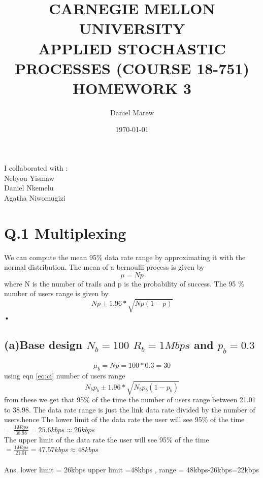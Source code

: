 \documentclass[a4paper,11pt]{article}
\begin{document}
\title{\color{red}CARNEGIE MELLON UNIVERSITY\\
APPLIED STOCHASTIC PROCESSES  (COURSE 18-751)\\
HOMEWORK 3}
\author{Daniel Marew}
\date{\today}
\clearpage\maketitle

\thispagestyle{empty}
\newpage
I collaborated with :\\
\hspace*{6cm}
Nebyou Yismaw\\
\hspace*{6cm}
Daniel    Nkemelu\\
\hspace*{6cm}
Agatha Niwomugizi
\thispagestyle{empty}
\newpage
\clearpage
\setcounter{page}{1}

\section*{Q.1 \quad Multiplexing}
We can compute the mean 95\% data rate range by approximating it with the normal distribution.
The mean of a bernoulli process   is given by $$\mu=Np$$
where N is the number of trails and p is the probability of success. 
The 95 \% number of users range is given by
\begin{equation}\label{eq:ci}
Np\pm1.96*\sqrt{Np(1-p)}
\end{equation}• 
\subsection*{(a)\quad Base design $N_b = 100$ $R_b = 1Mbps$ and $p_b=0.3$}
$$\mu_b = Np = 100*0.3=30$$
using eqn \ref{eq:ci} number of users range  $$N_bp_b\pm1.96*\sqrt{N_bp_b(1-p_b)}$$ 
from these we get that 95\% of the time the number of users range between 21.01 to 38.98.
The data rate range is just the link data rate divided by the number of users.hence 
The lower limit of the data rate the user will see 95\% of the time $= \frac{1Mbps}{38.98}=25.6kbps\approx26kbps$\\
The upper limit of the data rate the user will see 95\% of the time $= \frac{1Mbps}{21.01}=47.57kbps\approx48kbps$\\\\
Ans. lower limit  = 26kbps upper limit =48kbps , range = 48kbps-26kbps=22kbps
\end{document}
